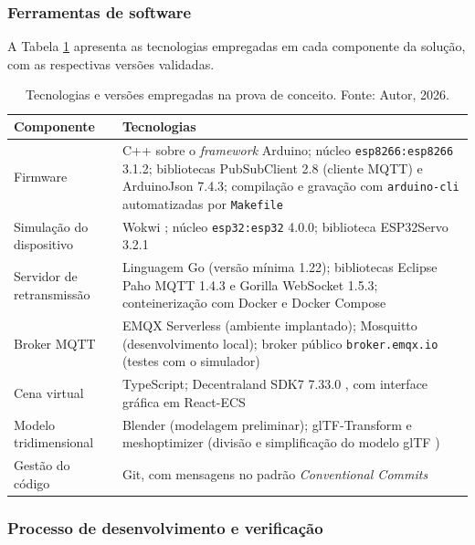 \documentclass[12pt]{article}
\begin{document}
\subsubsection{Ferramentas de software}
\label{subsec:ferramentas}

A Tabela \ref{tab:software} apresenta as tecnologias empregadas em cada componente da solução, com as respectivas versões validadas.

\begin{table}[htbp]
    \centering
    \small
    \caption{Tecnologias e versões empregadas na prova de conceito. Fonte: Autor, 2026.}
    \begin{tabular}{| p{3.2cm} | p{10cm} |}
        \hline
        \textbf{Componente} & \textbf{Tecnologias} \\ \hline
        Firmware & C++ sobre o \textit{framework} Arduino; núcleo \texttt{esp8266:esp8266} 3.1.2; bibliotecas PubSubClient 2.8 (cliente MQTT) e ArduinoJson 7.4.3; compilação e gravação com \texttt{arduino-cli} automatizadas por \texttt{Makefile} \\ \hline
        Simulação do dispositivo & Wokwi \cite{wokwi}; núcleo \texttt{esp32:esp32} 4.0.0; biblioteca ESP32Servo 3.2.1 \\ \hline
        Servidor de retransmissão & Linguagem Go (versão mínima 1.22); bibliotecas Eclipse Paho MQTT 1.4.3 e Gorilla WebSocket 1.5.3; conteinerização com Docker e Docker Compose \\ \hline
        Broker MQTT & EMQX Serverless (ambiente implantado); Mosquitto (desenvolvimento local); broker público \texttt{broker.emqx.io} (testes com o simulador) \\ \hline
        Cena virtual & TypeScript; Decentraland SDK7 7.33.0 \cite{decentraland_sdk}, com interface gráfica em React-ECS \\ \hline
        Modelo tridimensional & Blender (modelagem preliminar); glTF-Transform e meshoptimizer (divisão e simplificação do modelo glTF \cite{gltf_spec}) \\ \hline
        Gestão do código & Git, com mensagens no padrão \textit{Conventional Commits} \\ \hline
    \end{tabular}
    \label{tab:software}
\end{table}

\subsubsection{Processo de desenvolvimento e verificação}
\label{subsec:processo}
\end{document}
